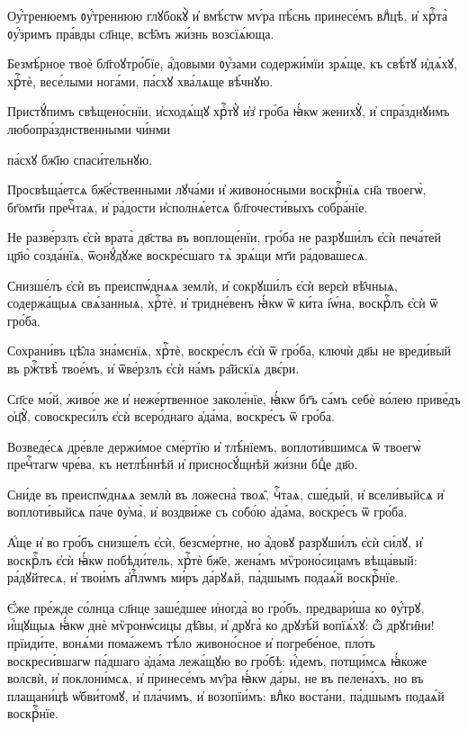 \hKv  Оу҆́тренюемъ ᲂу҆́треннюю глꙋбокꙋ̀ и҆ вмѣ́стѡ  мѵ́ра пѣ́снь принесе́мъ влⷣцѣ, и҆ хрⷭ҇та̀ ᲂу҆́зримъ  пра́вды сл҃нце, всѣ̑мъ жи́знь возсїѧ́юща.  

\hKv Безмѣ́рное твоѐ бл҃гоꙋтро́бїе, а҆́довыми ᲂу҆́зами  содержи́мїи зрѧ́ще, къ свѣ́тꙋ и҆дѧ́хꙋ, хрⷭ҇тѐ, весе́лыми  нога́ми, па́схꙋ хва́лѧще вѣ́чнꙋю. 

\hKv Пристꙋ́пимъ свѣщено́снїи, и҆сходѧ́щꙋ хрⷭ҇тꙋ̀ и҆з̾ гро́ба  ꙗ҆́кѡ женихꙋ̀, и҆ спра́зднꙋимъ любопра́зднственными чи́нми  

\hKv па́схꙋ бж҃їю спаси́тельнꙋю. 

\hKv  Просвѣща́етсѧ бж҃е́ственными лꙋча́ми и҆  живоно́сными воскрⷭ҇нїѧ сн҃а твоегѡ̀, бг҃омт҃и пречⷭ҇таѧ, и҆  ра́дости и҆сполнѧ́етсѧ бл҃гочести́выхъ собра́нїе. 

\hKv  Не разве́рзлъ є҆сѝ врата̀ дв҃ства въ  воплоще́нїи, гро́ба не разрꙋши́лъ є҆сѝ печа́тей цр҃ю̀  созда́нїѧ, ѿѻнꙋ́дꙋже воскре́сшаго тѧ̀ зрѧ́щи мт҃и  ра́довашесѧ.  
%

\hKv Снизше́лъ є҆сѝ въ преиспѡ́днѧѧ землѝ, и҆  сокрꙋши́лъ є҆сѝ верєѝ вѣ̑чныѧ, содержа́щыѧ свѧ́занныѧ,  хрⷭ҇тѐ, и҆ тридне́венъ ꙗ҆́кѡ ѿ ки́та і҆ѡ́на, воскрⷭ҇лъ  є҆сѝ ѿ гро́ба. 

\hKv Сохрани́въ цѣ̑ла зна́мєнїѧ, хрⷭ҇тѐ, воскре́слъ є҆сѝ ѿ  гро́ба, ключѝ дв҃ы не вреди́вый въ ржⷭ҇твѣ̀ твое́мъ, и҆  ѿве́рзлъ є҆сѝ на́мъ ра̑йскїѧ двє́ри. 

\hKv Сп҃се мо́й, живо́е же и҆ неже́ртвенное заколе́нїе, ꙗ҆́кѡ  бг҃ъ са́мъ себѐ во́лею приве́дъ ѻ҆ц҃ꙋ̀, совоскреси́лъ  є҆сѝ всеро́днаго а҆да́ма, воскре́съ ѿ гро́ба. 

\hKv  Возведе́сѧ дре́вле держи́мое сме́ртїю и҆  тлѣ́нїемъ, воплоти́вшимсѧ ѿ твоегѡ̀ пречⷭ҇тагѡ чре́ва, къ  нетлѣ́ннѣй и҆ присносꙋ́щнѣй жи́зни бцⷣе дв҃о. 

\hKv  Сни́де въ преиспѡ́днѧѧ землѝ въ ложесна̀ твоѧ̑,  чⷭ҇таѧ, сше́дый, и҆ всели́выйсѧ и҆ воплоти́выйсѧ па́че  ᲂу҆ма̀, и҆ воздви́же съ собо́ю а҆да́ма, воскре́съ ѿ  гро́ба.  
%

\hKv А҆́ще и҆ во гро́бъ снизше́лъ є҆сѝ,  безсме́ртне, но а҆́довꙋ разрꙋши́лъ є҆сѝ си́лꙋ, и҆  воскрⷭ҇лъ є҆сѝ ꙗ҆́кѡ побѣди́тель, хрⷭ҇тѐ бж҃е, жена́мъ  мѷроно́сицамъ вѣща́вый: ра́дꙋйтесѧ, и҆ твои́мъ а҆пⷭ҇лѡмъ  ми́ръ да́рꙋѧй, па́дшымъ подаѧ́й воскрⷭ҇нїе. 
%

\hKv Є҆́же пре́жде со́лнца сл҃нце заше́дшее и҆ногда̀ во  гро́бъ, предвари́ша ко ᲂу҆́трꙋ, и҆́щꙋщыѧ ꙗ҆́кѡ днѐ  мѷронѡ́сицы дѣ̑вы, и҆ дрꙋга̀ ко дрꙋзѣ́й вопїѧ́хꙋ: ѽ  дрꙋги̑ни! прїиди́те, вонѧ́ми пома́жемъ тѣ́ло живоно́сное и҆  погребе́ное, пло́ть воскреси́вшагѡ па́дшаго а҆да́ма лежа́щꙋю  во гро́бѣ: и҆́демъ, потщи́мсѧ ꙗ҆́коже волсвѝ, и҆  поклони́мсѧ, и҆ принесе́мъ мѵ̑ра ꙗ҆́кѡ да́ры, не въ  пелена́хъ, но въ плащани́цѣ ѡ҆бви́томꙋ, и҆ пла́чимъ, и҆  возопїи́мъ: влⷣко воста́ни, па́дшымъ подаѧ́й воскрⷭ҇нїе. 


